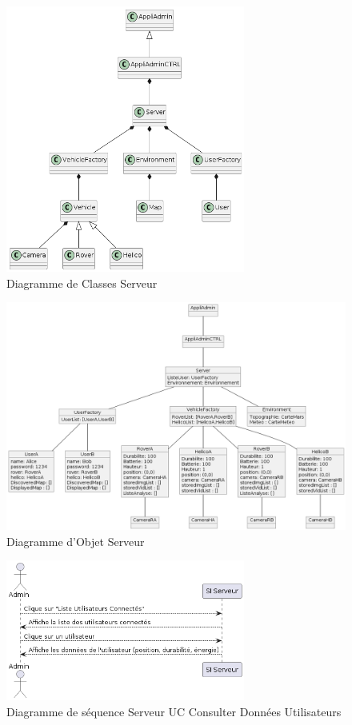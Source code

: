 \documentclass[12pt,a4paper]{scrartcl}
\begin{document}
\begin{figure}
    \centering
    \includegraphics[width=0.7\textwidth]{Diag_Class_Admin.png}
    \caption{Diagramme de Classes Serveur}\label{seq_serv}
\end{figure}

\begin{figure}
    \centering
    \includegraphics[width=1\textwidth]{Diag_Obj_Admin.png}
    \caption{Diagramme d'Objet Serveur}\label{obj_serv}
\end{figure}

\begin{figure}
    \centering
    \includegraphics[width=0.7\textwidth]{diag_seq_admin_consulter.png}
    \caption{Diagramme de séquence Serveur UC Consulter Données Utilisateurs }\label{seq1_serv}
\end{figure}
\end{document}
